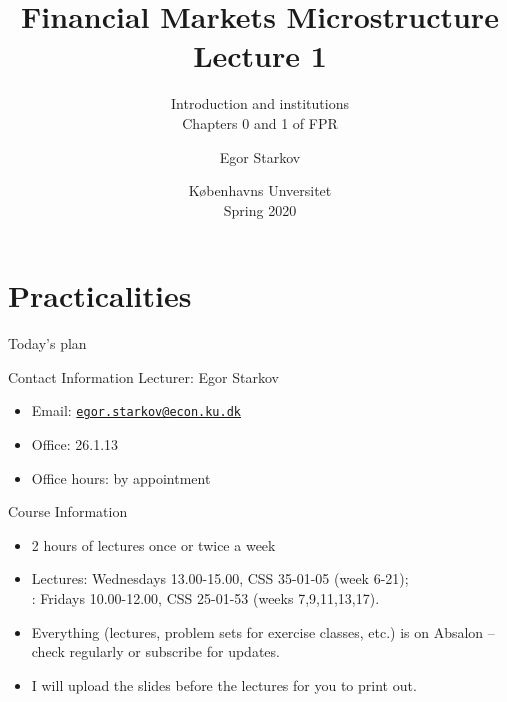 




\title{Financial Markets Microstructure \\ Lecture 1}

\subtitle{Introduction and institutions \\
Chapters 0 and 1 of FPR}

\author{Egor Starkov}

\date{K{\o}benhavns Unversitet \\
	Spring 2020}




\frame[plain]{\titlepage}
\addtocounter{framenumber}{-1}



\section{Practicalities}

\begin{frame}{Today's plan}
\tableofcontents[]
\end{frame}


\begin{frame}{Contact Information}
Lecturer: Egor Starkov
\begin{itemize}
	\item Email: \href{mailto:egor.starkov@econ.ku.dk}{\texttt{egor.starkov@econ.ku.dk}}
	\item Office: 26.1.13
	\item Office hours: by appointment
\end{itemize}
\end{frame}


\begin{frame}{Course Information}
\begin{itemize}
	\item 2 hours of lectures once or twice a week
	\item \alert{Lectures}: Wednesdays 13.00-15.00, CSS 35-01-05 (week 6-21); 
		\\ : Fridays 10.00-12.00, CSS 25-01-53 (weeks 7,9,11,13,17).
	\item Everything (lectures, problem sets for exercise classes, etc.) is on Absalon -- check regularly or subscribe for updates.
	\item I will upload the slides before the lectures for you to print out.
\end{itemize}
\end{frame}


